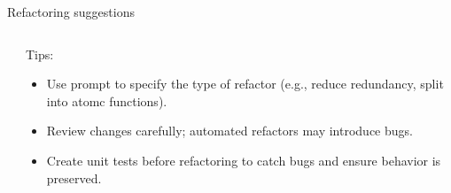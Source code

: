 \documentclass[
  aspectratio=1610,
]{beamer}
\begin{document}
\begin{frame}{Refactoring suggestions}
  \begin{columns}[T,totalwidth=\textwidth]
    \begin{column}{0.6\textwidth}
    \end{column}
    \begin{column}{0.37\textwidth}
      Tips:
      \begin{itemize}
        \item Use prompt to specify the type of refactor (e.g., reduce redundancy, split into atomc functions).
        \item Review changes carefully; automated refactors may introduce bugs.
        \item Create unit tests before refactoring to catch bugs and ensure behavior is preserved.
      \end{itemize}
    \end{column}
  \end{columns}
\end{frame}
\end{document}
